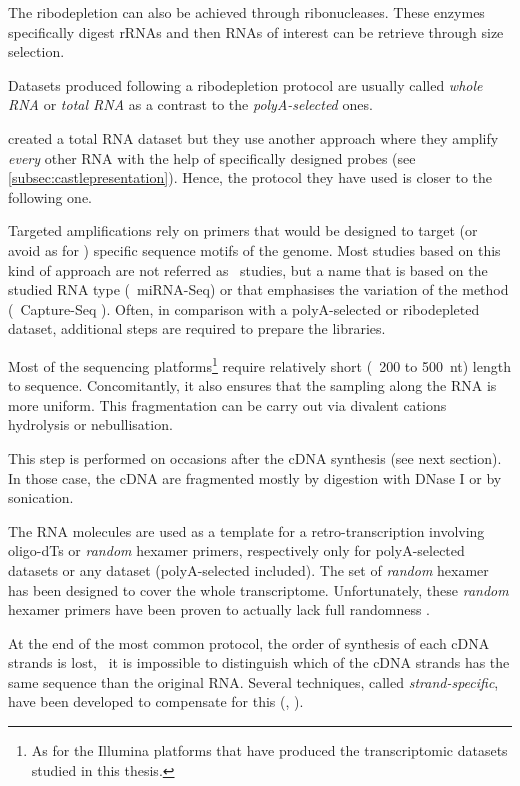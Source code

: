 The ribodepletion can also be achieved through ribonucleases. These enzymes
specifically digest \glspl{rRNA} and then \glspl{RNA} of interest can be retrieve
through size selection.

Datasets produced following a ribodepletion protocol are usually called
\emph{whole \gls{RNA}} or \emph{total \gls{RNA}} as a contrast to the
\emph{polyA-selected} ones.

\cite{castleData} created a total \gls{RNA} dataset but they use another
approach where they amplify \emph{every} other \gls{RNA} with the help of
specifically designed probes (see \cref{subsec:castlepresentation}). Hence,
the protocol they have used is closer to the following one.

Targeted amplifications rely on primers that would be designed to target (or
avoid as for \cite{castleData}) specific sequence motifs of the genome. Most
studies based on this kind of approach are not referred as \Rnaseq\ studies, but
a name that is based on the studied \gls{RNA} type (\eg\ \gls{miRNA-Seq}) or
that emphasises the variation of the method (\eg\ Capture-Seq
). Often, in comparison with a polyA-selected or ribodepleted
dataset, additional steps are required to prepare the libraries.


Most of the sequencing platforms\footnote{As for the Illumina platforms that have
produced the transcriptomic datasets studied in this thesis.} require relatively
short (\ie\ 200 to 500\ nt) length to sequence. Concomitantly, it also ensures
that the sampling along the \gls{RNA} is more uniform.
This fragmentation can be carry out via divalent cations hydrolysis or
nebullisation.

This step is performed on occasions after the \gls{cDNA} synthesis
(see next section). In those case, the \gls{cDNA} are fragmented mostly
by digestion with DNase I or by sonication.

The \gls{RNA} molecules are used as a template for a retro-transcription
involving oligo-dTs or \emph{random} hexamer primers, respectively only
for polyA-selected datasets or any dataset (polyA-selected included).
The set of \emph{random} hexamer has been designed to cover the whole
transcriptome. Unfortunately, these \emph{random} hexamer primers have been
proven to actually lack full randomness .

At the end of the most common protocol, the order of synthesis of each \gls{cDNA}
strands is lost, \ie\ it is impossible to distinguish which of the \gls{cDNA}
strands has the same sequence than the original \gls{RNA}. Several techniques,
called \emph{strand-specific}, have been developed to compensate for this
(, ).

